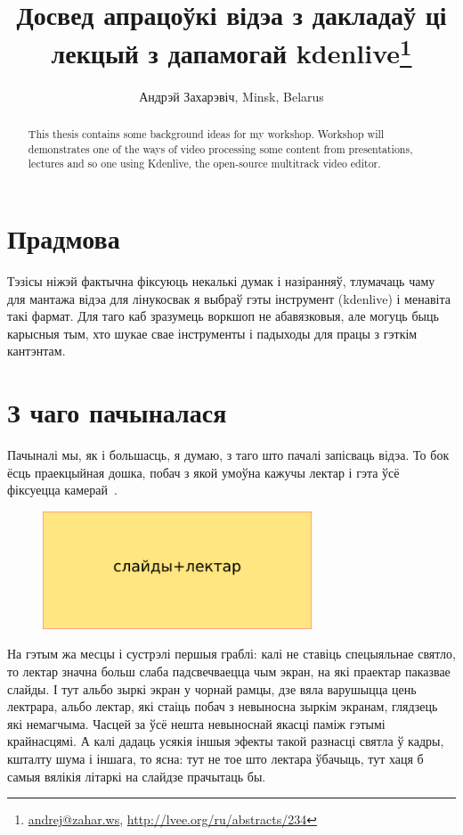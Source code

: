 \documentclass[10pt, a5paper]{article}
\begin{document}
\title{Досвед апрацоўкі відэа з дакладаў ці лекцый з дапамогай kdenlive\footnote{\url{andrej@zahar.ws}, \url{http://lvee.org/ru/abstracts/234}}}
\author{Андрэй Захарэвіч, Minsk, Belarus}
\maketitle
\begin{abstract}
This thesis contains some background ideas for my workshop. Workshop will demonstrates one of the ways of video processing some content from presentations, lectures and so one using \linebreak Kdenlive, the open-source multitrack video editor.
\end{abstract}
\section*{Прадмова}

Тэзісы ніжэй фактычна фіксуюць некалькі думак і назіранняў, тлумачаць чаму для мантажа відэа для лінукосвак я выбраў гэты інструмент (kdenlive) і менавіта такі фармат. Для таго каб зразумець воркшоп не абавязковыя, але могуць быць карысныя тым, хто шукае свае інструменты і падыходы для працы з гэткім кантэнтам.

\section*{З чаго пачыналася}

Пачыналі мы, як і большасць, я думаю, з таго што пачалі запісваць відэа. То бок ёсць праекцыйная дошка, побач з якой умоўна кажучы лектар і гэта ўсё фіксуецца камерай~\cite{Zakharevich1}.


\begin{figure}[h!]
  \centering
  \includegraphics[width=8cm]{32_2016_Zakharevich1.png}
\end{figure}

На гэтым жа месцы і сустрэлі першыя граблі: калі не ставіць спецыяльнае святло, то лектар значна больш слаба падсвечваецца чым экран, на які праектар паказвае слайды. І тут альбо зыркі экран у чорнай рамцы, дзе вяла варушыцца цень лектрара, альбо лектар, які стаіць побач з невыносна зыркім экранам, глядзець які немагчыма. Часцей за ўсё нешта невыноснай якасці паміж гэтымі крайнасцямі. А калі дадаць усякія іншыя эфекты такой разнасці святла ў кадры, кшталту шума і іншага, то ясна: тут не тое што лектара ўбачыць, тут хаця б самыя вялікія літаркі на слайдзе прачытаць бы.
\end{document}
